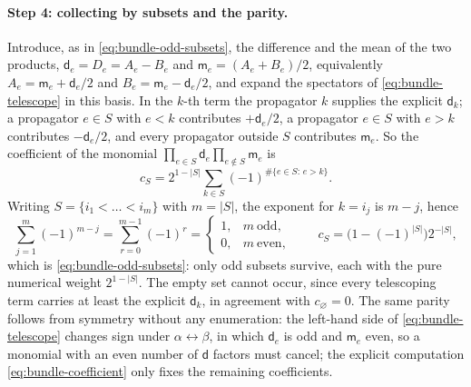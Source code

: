 \documentclass[11pt,a4paper]{article}
\begin{document}
\paragraph{Step 4: collecting by subsets and the parity.}
Introduce, as in \eqref{eq:bundle-odd-subsets}, the difference and the mean of the two
products, $\mathsf d_e=D_e=A_e-B_e$ and $\mathsf m_e=(A_e+B_e)/2$, equivalently
$A_e=\mathsf m_e+\mathsf d_e/2$ and $B_e=\mathsf m_e-\mathsf d_e/2$, and expand the spectators of
\eqref{eq:bundle-telescope} in this basis. In the $k$-th term the propagator $k$ supplies the explicit
$\mathsf d_k$; a propagator $e\in S$ with $e<k$ contributes $+\mathsf d_e/2$, a propagator $e\in S$ with $e>k$
contributes $-\mathsf d_e/2$, and every propagator outside $S$ contributes $\mathsf m_e$. So the
coefficient of the monomial $\prod_{e\in S}\mathsf d_e\prod_{e\notin S}\mathsf m_e$ is
\begin{equation}
  c_S = 2^{1-|S|}\sum_{k\in S}(-1)^{\#\{e\in S:\,e>k\}} .
  \label{eq:bundle-coefficient}
\end{equation}
Writing $S=\{i_1<\dots<i_m\}$ with $m=|S|$, the exponent for $k=i_j$ is $m-j$, hence
\begin{equation}
  \sum_{j=1}^{m}(-1)^{m-j}=\sum_{r=0}^{m-1}(-1)^{r}
  =\begin{cases}1,&m\ \text{odd},\\ 0,&m\ \text{even},\end{cases}
  \qquad
  c_S=\bigl(1-(-1)^{|S|}\bigr)2^{-|S|},
  \label{eq:bundle-parity}
\end{equation}
which is \eqref{eq:bundle-odd-subsets}: only odd subsets survive, each with the pure numerical
weight $2^{1-|S|}$. The empty set cannot occur, since every telescoping term carries at least the
explicit $\mathsf d_k$, in agreement with $c_\varnothing=0$. The same parity follows from symmetry
without any enumeration: the left-hand side of \eqref{eq:bundle-telescope} changes sign under
$\alpha\leftrightarrow\beta$, in which $\mathsf d_e$ is odd and $\mathsf m_e$ even, so a monomial
with an even number of $\mathsf d$ factors must cancel; the explicit computation
\eqref{eq:bundle-coefficient} only fixes the remaining coefficients.
\end{document}
